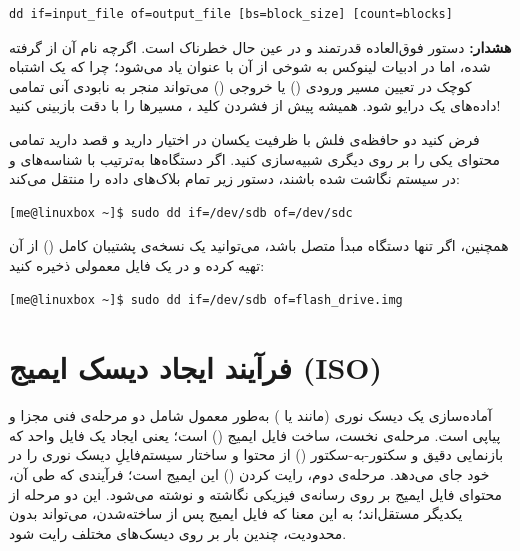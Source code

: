 \begin{latin}
\begin{lstlisting}
dd if=input_file of=output_file [bs=block_size] [count=blocks]
\end{lstlisting}
\end{latin}

\begin{warning}
\textbf{هشدار:} دستور  فوق‌العاده قدرتمند و در عین حال خطرناک است. اگرچه نام آن از  گرفته شده، اما در ادبیات لینوکس به شوخی از آن با عنوان  یاد می‌شود؛ چرا که یک اشتباه کوچک در تعیین مسیر ورودی () یا خروجی () می‌تواند منجر به نابودی آنی تمامی داده‌های یک درایو شود. همیشه پیش از فشردن کلید ، مسیرها را با دقت بازبینی کنید!
\end{warning}

فرض کنید دو حافظه‌ی فلش با ظرفیت یکسان در اختیار دارید و قصد دارید تمامی محتوای یکی را بر روی دیگری شبیه‌سازی کنید. اگر دستگاه‌ها به‌ترتیب با شناسه‌های  و  در سیستم نگاشت شده باشند، دستور زیر تمام بلاک‌های داده را منتقل می‌کند:

\begin{latin}
\begin{lstlisting}
[me@linuxbox ~]$ sudo dd if=/dev/sdb of=/dev/sdc
\end{lstlisting}
\end{latin}

همچنین، اگر تنها دستگاه مبدأ متصل باشد، می‌توانید یک نسخه‌ی پشتیبان کامل () از آن تهیه کرده و در یک فایل معمولی ذخیره کنید:

\begin{latin}
\begin{lstlisting}
[me@linuxbox ~]$ sudo dd if=/dev/sdb of=flash_drive.img
\end{lstlisting}
\end{latin}

\section{فرآیند ایجاد دیسک ایمیج (ISO)}

آماده‌سازی یک دیسک نوری (مانند  یا ) به‌طور معمول شامل دو مرحله‌ی فنی مجزا و پیاپی است. مرحله‌ی نخست، ساخت فایل ایمیج () است؛ یعنی ایجاد یک فایل واحد که بازنمایی دقیق و سکتور-به-سکتور () از محتوا و ساختار سیستم‌فایلِ دیسک نوری را در خود جای می‌دهد. مرحله‌ی دوم، رایت کردن () این ایمیج است؛ فرآیندی که طی آن، محتوای فایل ایمیج بر روی رسانه‌ی فیزیکی نگاشته و نوشته می‌شود. این دو مرحله از یکدیگر مستقل‌اند؛ به این معنا که فایل ایمیج پس از ساخته‌شدن، می‌تواند بدون محدودیت، چندین بار بر روی دیسک‌های مختلف رایت شود.

